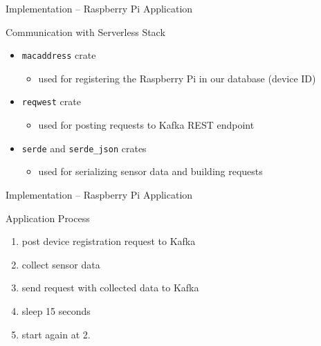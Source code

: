 \begin{frame}{Implementation -- Raspberry Pi Application}
  \begin{block}{Communication with Serverless Stack}
    \begin{itemize}
      \item \texttt{macaddress} crate
        \begin{itemize}
          \item used for registering the Raspberry Pi in our database (device ID)
        \end{itemize}
      \item \texttt{reqwest} crate
        \begin{itemize}
          \item used for posting requests to Kafka REST endpoint
        \end{itemize}
      \item \texttt{serde} and \texttt{serde\_json} crates
        \begin{itemize}
          \item used for serializing sensor data and building requests
        \end{itemize}
    \end{itemize}
  \end{block}
\end{frame}

\begin{frame}{Implementation -- Raspberry Pi Application}
  \begin{block}{Application Process}
    \begin{enumerate}
      \item post device registration request to Kafka
      \item collect sensor data
      \item send request with collected data to Kafka
      \item sleep 15 seconds
      \item start again at 2.
    \end{enumerate}
  \end{block}
\end{frame}
